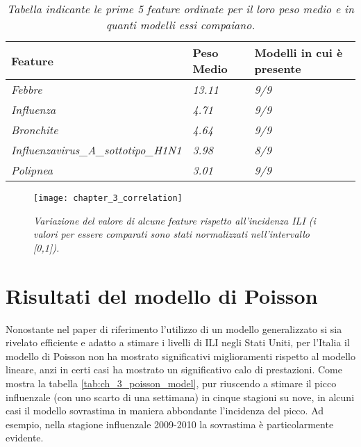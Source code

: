 \begin{table}[p]
\centering
\begin{adjustbox}{max width=\textwidth}
\begin{tabular}{|l|l|l|}
\hline
\rowcolor[HTML]{EFEFEF} 
\textbf{Feature}                            & \textbf{Peso Medio} & \textbf{Modelli in cui è presente} \\ \hline
\textit{Febbre}                             & \textit{13.11}      & \textit{9/9}                                            \\ \hline
\textit{Influenza}                          & \textit{4.71}       & \textit{9/9}                                            \\ \hline
\textit{Bronchite}                          & \textit{4.64}       & \textit{9/9}                                            \\ \hline
\textit{Influenzavirus\_A\_sottotipo\_H1N1} & \textit{3.98}       & \textit{8/9}                                            \\ \hline
\textit{Polipnea}                           & \textit{3.01}       & \textit{9/9}                                            \\ \hline
\end{tabular}
\end{adjustbox}
\caption{\textit{Tabella indicante le prime 5 feature ordinate per il loro peso medio e in quanti modelli essi compaiano.}}
\label{tab:linear_model_feature}
\end{table}

\begin{figure}[p]
\texttt{[image: chapter\_3\_correlation]}
\caption{\textit{Variazione del valore di alcune feature rispetto all'incidenza ILI (i valori per essere comparati sono stati normalizzati nell'intervallo [0,1]).}}
\label{fig:ch_3_correlation}
\centering
\end{figure}

\section{Risultati del modello di Poisson}

Nonostante nel paper di riferimento l'utilizzo di un modello generalizzato si sia rivelato efficiente e adatto a stimare i livelli di ILI negli Stati Uniti, per l'Italia il modello di Poisson non ha mostrato significativi miglioramenti rispetto al modello lineare, anzi in certi casi ha mostrato un significativo calo di prestazioni. Come mostra la tabella \ref{tab:ch_3_poisson_model}, pur riuscendo a stimare il picco influenzale (con uno scarto di una settimana) in cinque stagioni su nove, in alcuni casi il modello sovrastima in maniera abbondante l'incidenza del picco. Ad esempio, nella stagione influenzale 2009-2010 la sovrastima è particolarmente evidente.
\bigskip

